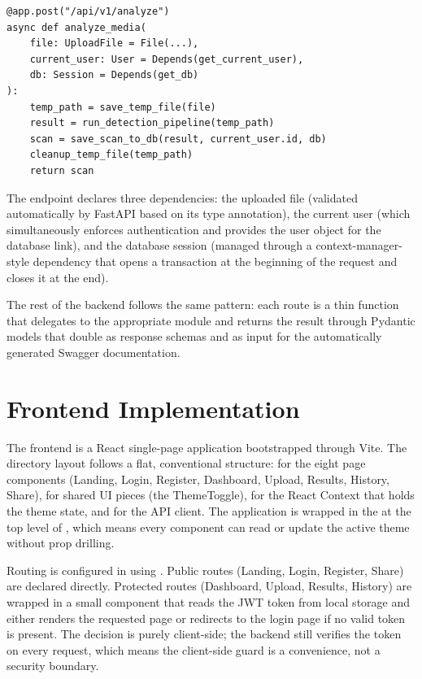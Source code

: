 \begin{verbatim}
@app.post("/api/v1/analyze")
async def analyze_media(
    file: UploadFile = File(...),
    current_user: User = Depends(get_current_user),
    db: Session = Depends(get_db)
):
    temp_path = save_temp_file(file)
    result = run_detection_pipeline(temp_path)
    scan = save_scan_to_db(result, current_user.id, db)
    cleanup_temp_file(temp_path)
    return scan
\end{verbatim}

The endpoint declares three dependencies: the uploaded file (validated automatically by FastAPI based on its type annotation), the current user (which simultaneously enforces authentication and provides the user object for the database link), and the database session (managed through a context-manager-style dependency that opens a transaction at the beginning of the request and closes it at the end).

The rest of the backend follows the same pattern: each route is a thin function that delegates to the appropriate module and returns the result through Pydantic models that double as response schemas and as input for the automatically generated Swagger documentation.

\section{Frontend Implementation}

The frontend is a React single-page application bootstrapped through Vite. The directory layout follows a flat, conventional structure:  for the eight page components (Landing, Login, Register, Dashboard, Upload, Results, History, Share),  for shared UI pieces (the ThemeToggle),  for the React Context that holds the theme state, and  for the API client. The application is wrapped in the  at the top level of , which means every component can read or update the active theme without prop drilling.

Routing is configured in  using . Public routes (Landing, Login, Register, Share) are declared directly. Protected routes (Dashboard, Upload, Results, History) are wrapped in a small  component that reads the JWT token from local storage and either renders the requested page or redirects to the login page if no valid token is present. The decision is purely client-side; the backend still verifies the token on every request, which means the client-side guard is a convenience, not a security boundary.

